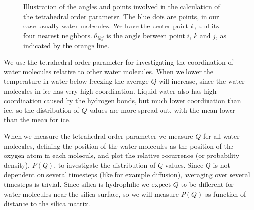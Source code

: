 %
\begin{figure}[htpb]%
    \centering%
    \caption{%
        Illustration of the angles and points involved in the calculation of the tetrahedral order parameter. The blue dots are points, in our case usually water molecules. We have the center point $k$, and its four nearest neighbors. $\theta_{ikj}$ is the angle between point $i$, $k$ and $j$, as indicated by the orange line.%
        \label{fig:top_tetrahedra}%
    }%
\end{figure}%

We use the tetrahedral order parameter for investigating the coordination of water molecules relative to other water molecules. When we lower the temperature in water below freezing the average $Q$ will increase, since the water molecules in ice has very high coordination. Liquid water also has high coordination caused by the hydrogen bonds, but much lower coordination than ice, so the distribution of $Q$-values are more spread out, with the mean lower than the mean for ice.

When we measure the tetrahedral order parameter we measure $Q$ for all water molecules, defining the position of the water molecules as the position of the oxygen atom in each molecule, and plot the relative occurrence (or probability density), $P(Q)$, to investigate the distribution of $Q$-values. Since $Q$ is not dependent on several timesteps (like for example diffusion), averaging over several timesteps is trivial. Since silica is hydrophilic we expect $Q$ to be different for water molecules near the silica surface, so we will measure $P(Q)$ as function of distance to the silica matrix.


